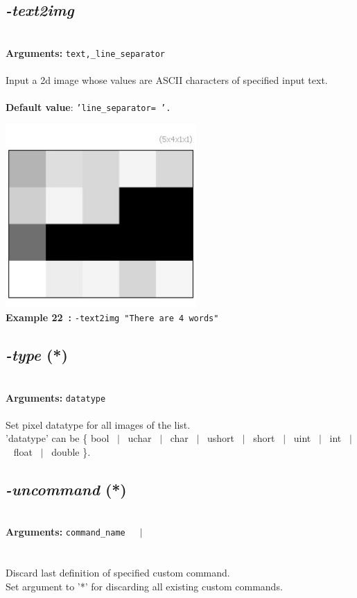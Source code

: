 \documentclass[a4paper,11pt,twoside]{book}
\begin{document}
\subsection{\emph{-text2img} }\vspace*{-0.5em}
~\\\textbf{Arguments: } 
{\small \texttt{text,\_line\_separator}}\\~\\
Input a 2d image whose values are ASCII characters of specified input text.
~\\~\\\textbf{Default value}: {\small \texttt{'line\_separator= '.}}
\begin{center}\includegraphics[keepaspectratio=true,height=7cm,width=\textwidth]{img/gmic_def22.jpg}\\
{\footnotesize \textbf{Example 22~:} \texttt{-text2img "There are 4 words"}}
\end{center}

\subsection{\emph{-type} (*)}\vspace*{-0.5em}
~\\\textbf{Arguments: } 
{\small \texttt{datatype}}\\~\\
Set pixel datatype for all images of the list.
~\\'datatype' can be \{ bool ~$|$~ uchar ~$|$~ char ~$|$~ ushort ~$|$~ short ~$|$~ uint ~$|$~ int ~$|$~ float ~$|$~ double \}.


\subsection{\emph{-uncommand} (*)}\vspace*{-0.5em}
~\\\textbf{Arguments: } 
{\small \texttt{command\_name}}~~~$|$\\
\hspace*{2.2cm}{\small \texttt{*}}\\~\\
Discard last definition of specified custom command.
~\\Set argument to '*' for discarding all existing custom commands.
\end{document}
